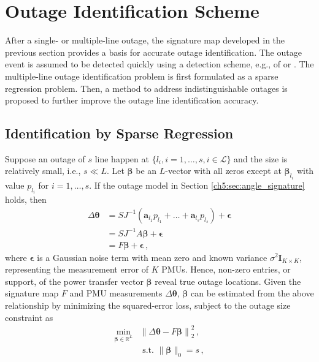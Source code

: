 \section{Outage Identification Scheme}
\label{ch5:sec:identification_scheme}
After a single- or multiple-line outage, the signature map developed in the previous section provides a basis for accurate outage identification. The outage event is assumed to be detected quickly using a detection scheme, e.g., of \cite{yang2020control} or \cite{yang2021particle}. The multiple-line outage identification problem is first formulated as a sparse regression problem. Then, a method to address indistinguishable outages is proposed to further improve the outage line identification accuracy. 

\subsection{Identification by Sparse Regression}
\label{ch5:sec:sparse_regression}
Suppose an outage of $s$ line happen at $\{l_i, i=1, \dots, s, i \in \mathcal{L}\}$ and the size is relatively small, i.e., $s \ll L$. Let $\boldsymbol{\beta}$ be an $L$-vector with all zeros except at $\boldsymbol{\beta}_{l_i}$ with value $p_{l_i}$ for $i = 1, \dots, s$.
If the outage model in Section \ref{ch5:sec:angle_signature} holds, then
\begin{align}
    \Delta\boldsymbol{\theta} &= S J^{-1} (\mathbf{a}_{l_1} p_{l_1} + \dots + \mathbf{a}_{l_s} p_{l_s}) + \boldsymbol{\epsilon} \nonumber\\
    &= S J^{-1} A \boldsymbol{\beta} + \boldsymbol{\epsilon} \nonumber\\
    &= F \boldsymbol{\beta} + \boldsymbol{\epsilon}  \,,
\end{align}
where $\boldsymbol{\epsilon}$ is a Gaussian noise term with mean zero and known variance $\sigma^2 \textbf{I}_{K\times K}$, representing the measurement error of $K$ PMUs. Hence, non-zero entries, or support, of the power transfer vector $\boldsymbol{\beta}$ reveal true outage locations. Given the signature map $F$ and PMU measurements $\Delta\boldsymbol{\theta}$, $\boldsymbol{\beta}$ can be estimated from the above relationship by minimizing the squared-error loss, subject to the outage size constraint as
\begin{align}
\label{ch5:eqn:l_0_formulation}
\underset{\boldsymbol{\beta} \in \mathbb{R}^{L}}{\min} &\left\|\Delta\boldsymbol{\theta} - F\boldsymbol{\beta}\right\|_{2}^{2} \,, \\
& \text { s.t. }\|\boldsymbol{\beta}\|_{0} = s \nonumber\,,
\end{align}
